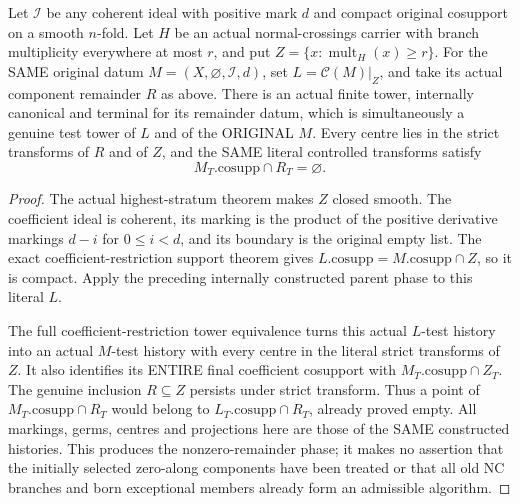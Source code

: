 \begin{theorem}
\label{hir:nc-original-coefficient-remainder-finite-phase}
\leanok
Let $\mathcal I$ be any coherent ideal with positive mark $d$ and compact
original cosupport on a smooth $n$-fold. Let $H$ be an actual normal-crossings
carrier with branch multiplicity everywhere at most $r$, and put
$Z=\{x:\operatorname{mult}_H(x)\ge r\}$. For the SAME original datum
$M=(X,\varnothing,\mathcal I,d)$, set $L=\mathcal C(M)|_Z$, and take its actual
component remainder $R$ as above. There is an actual finite tower, internally
canonical and terminal for its remainder datum, which is simultaneously a
genuine test tower of $L$ and of the ORIGINAL $M$. Every centre lies in the
strict transforms of $R$ and of $Z$, and the SAME literal controlled transforms
satisfy
\[
 M_T.\mathrm{cosupp}\cap R_T=\varnothing.
\]
\end{theorem}
\begin{proof}
The actual highest-stratum theorem makes $Z$ closed smooth. The coefficient
ideal is coherent, its marking is the product of the positive derivative
markings $d-i$ for $0\le i<d$, and its boundary is the original empty list.
The exact coefficient-restriction support theorem gives
$L.\mathrm{cosupp}=M.\mathrm{cosupp}\cap Z$, so it is compact. Apply the preceding
internally constructed parent phase to this literal $L$.

The full coefficient-restriction tower equivalence turns this actual $L$-test
history into an actual $M$-test history with every centre in the literal strict
transforms of $Z$. It also identifies its ENTIRE final coefficient cosupport
with $M_T.\mathrm{cosupp}\cap Z_T$. The genuine inclusion $R\subseteq Z$ persists
under strict transform. Thus a point of $M_T.\mathrm{cosupp}\cap R_T$ would belong
to $L_T.\mathrm{cosupp}\cap R_T$, already proved empty. All markings, germs,
centres and projections here are those of the SAME constructed histories.
This produces the nonzero-remainder phase; it makes no assertion that the
initially selected zero-along components have been treated or that all old
NC branches and born exceptional members already form an admissible algorithm.
\end{proof}
